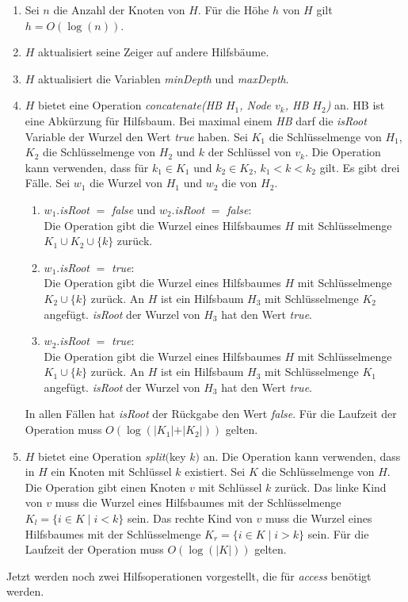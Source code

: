 \documentclass[a4paper,12pt]{article}
\begin{document}
\begin{enumerate}
	\item Sei $n$ die Anzahl der Knoten von $H$. Für die Höhe $h$ von $H$ gilt \mbox{$h = O\left(\log \left(n\right)\right)$}.
	\item $H$ aktualisiert seine Zeiger auf andere Hilfsbäume.
	\item $H$ aktualisiert die Variablen  \textit{minDepth} und \textit{maxDepth}.
	\item $H$ bietet eine Operation \textit{concatenate(HB $H_1$, Node $v_k$, HB  $H_2$)} an. HB ist eine Abkürzung für Hilfsbaum. Bei maximal einem \textit{HB}  darf die \textit{isRoot} Variable der Wurzel den Wert \textit{true} haben. Sei $K_1$ die Schlüsselmenge von $H_1$, $K_2$ die Schlüsselmenge von $H_2$ und $k$ der Schlüssel von $v_k$. Die Operation kann verwenden, dass für $k_1 \in K_1$ und $k_2 \in K_2$, $k_1 < k < k_2$ gilt. Es gibt drei Fälle. Sei $w_1$ die Wurzel von $H_1$ und $w_2$ die von $H_2$.
	\begin{enumerate}
		\item $w_1$.\textit{isRoot} $=$ \textit{false} und $w_2$.\textit{isRoot} $=$ \textit{false}:\\
		Die Operation gibt die Wurzel eines Hilfsbaumes $H$ mit Schlüsselmenge $K_1 \cup K_2 \cup \{k\} $ zurück.
		\item $w_1$.\textit{isRoot} $=$ \textit{true}:\\	
		Die Operation gibt die Wurzel eines Hilfsbaumes $H$ mit Schlüsselmenge $K_2 \cup \{k\} $ zurück. An $H$ ist ein Hilfsbaum $H_3$ mit Schlüsselmenge $K_2$ angefügt. \textit{isRoot} der Wurzel von $H_3$ hat den Wert \textit{true}.
		\item $w_2$.\textit{isRoot} $=$ \textit{true}:\\	
		Die Operation gibt die Wurzel eines Hilfsbaumes $H$ mit Schlüsselmenge $K_1 \cup \{k\} $ zurück. An $H$ ist ein Hilfsbaum $H_3$ mit Schlüsselmenge $K_1$ angefügt. \textit{isRoot} der Wurzel von $H_3$ hat den Wert \textit{true}.	 
	\end{enumerate}
	In allen Fällen hat \textit{isRoot} der Rückgabe den Wert \textit{false}.
	Für die Laufzeit der Operation muss $O\left(\log \left(\vert K_1 \vert + \vert K_2 \vert\right)\right)$ gelten.
	\item $H$ bietet eine Operation \textit{split}$($key $k)$ an. Die Operation kann verwenden, dass in $H$ ein Knoten mit Schlüssel $k$ existiert. Sei $K$ die Schlüsselmenge von $H$. Die Operation gibt einen Knoten $v$ mit Schlüssel $k$ zurück. Das linke Kind von $v$ muss die Wurzel eines Hilfsbaumes mit der Schlüsselmenge ${K_l=\{i\in K \mid  i <k\}}$ sein. Das rechte Kind von $v$ muss die Wurzel eines Hilfsbaumes mit der Schlüsselmenge ${K_r=\{i\in K \mid  i > k\}}$ sein. Für die Laufzeit der Operation muss $O\left(\log \left(\vert K \vert\right) \right)$ gelten.
\end{enumerate} 
Jetzt werden noch zwei Hilfsoperationen vorgestellt, die für \textit{access} benötigt werden.\\
\end{document}
